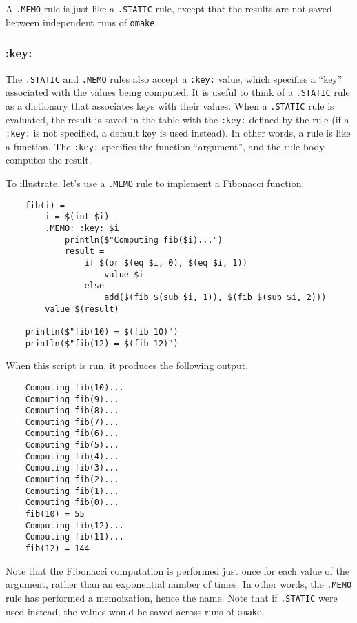 A \verb+.MEMO+ rule is just like a \verb+.STATIC+ rule, except that the results are not saved
between independent runs of \verb+omake+.

\subsubsection{:key:}

The \verb+.STATIC+ and \verb+.MEMO+ rules also accept a \verb+:key:+ value, which specifies a
``key'' associated with the values being computed.  It is useful to think of a \verb+.STATIC+ rule
as a dictionary that associates keys with their values.  When a \verb+.STATIC+ rule is evaluated,
the result is saved in the table with the \verb+:key:+ defined by the rule (if a \verb+:key:+ is not
specified, a default key is used instead).  In other words, a rule is like a function.  The
\verb+:key:+ specifies the function ``argument'', and the rule body computes the result.

To illustrate, let's use a \verb+.MEMO+ rule to implement a Fibonacci function.

\begin{verbatim}
    fib(i) =
        i = $(int $i)
        .MEMO: :key: $i
            println($"Computing fib($i)...")
            result =
                if $(or $(eq $i, 0), $(eq $i, 1))
                    value $i
                else
                    add($(fib $(sub $i, 1)), $(fib $(sub $i, 2)))
        value $(result)

    println($"fib(10) = $(fib 10)")
    println($"fib(12) = $(fib 12)")
\end{verbatim}
%
When this script is run, it produces the following output.

\begin{verbatim}
    Computing fib(10)...
    Computing fib(9)...
    Computing fib(8)...
    Computing fib(7)...
    Computing fib(6)...
    Computing fib(5)...
    Computing fib(4)...
    Computing fib(3)...
    Computing fib(2)...
    Computing fib(1)...
    Computing fib(0)...
    fib(10) = 55
    Computing fib(12)...
    Computing fib(11)...
    fib(12) = 144
\end{verbatim}
%
Note that the Fibonacci computation is performed just once for each value of the argument, rather
than an exponential number of times.  In other words, the \verb+.MEMO+ rule has performed a
memoization, hence the name.  Note that if \verb+.STATIC+ were used instead, the values would be
saved across runs of \verb+omake+.

